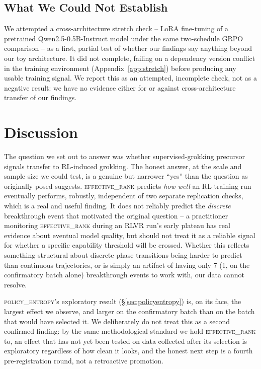 \documentclass{article}
\newcommand{\erank}{\textsc{effective\_rank}}
\newcommand{\pentropy}{\textsc{policy\_entropy}}
\begin{document}
\subsection{What We Could Not Establish}
\label{sec:notestablished}

We attempted a cross-architecture stretch check -- LoRA fine-tuning
\citep{hu2022lora} of a pretrained Qwen2.5-0.5B-Instruct model
\citep{qwen2024qwen25} under the same two-schedule GRPO comparison -- as a
first, partial test of whether our findings say anything beyond our toy
architecture. It did not complete, failing on a dependency version conflict in
the training environment (Appendix~\ref{app:stretch}) before producing any
usable training signal. We report this as an attempted, incomplete check, not
as a negative result: we have no evidence either for or against
cross-architecture transfer of our findings.

\section{Discussion}
\label{sec:discussion}

The question we set out to answer was whether supervised-grokking precursor
signals transfer to RL-induced grokking. The honest answer, at the scale and
sample size we could test, is a genuine but narrower ``yes'' than the question
as originally posed suggests. \erank{} predicts \emph{how well} an RL
training run eventually performs, robustly, independent of two separate
replication checks, which is a real and useful finding. It does not reliably
predict the \emph{discrete} breakthrough event that motivated the original
question -- a practitioner monitoring \erank{} during an RLVR run's early
plateau has real evidence about eventual model quality, but should not treat
it as a reliable signal for whether a specific capability threshold will be
crossed. Whether this reflects something structural about discrete phase
transitions being harder to predict than continuous trajectories, or is
simply an artifact of having only 7 (1, on the confirmatory batch alone)
breakthrough events to work with, our data cannot resolve.

\pentropy{}'s exploratory result (\S\ref{sec:policyentropy}) is, on its face,
the largest effect we observe, and larger on the confirmatory batch than on
the batch that would have selected it. We deliberately do not treat this as a
second confirmed finding: by the same methodological standard we hold \erank{}
to, an effect that has not yet been tested on data collected after its
selection is exploratory regardless of how clean it looks, and the honest
next step is a fourth pre-registration round, not a retroactive promotion.
\end{document}
